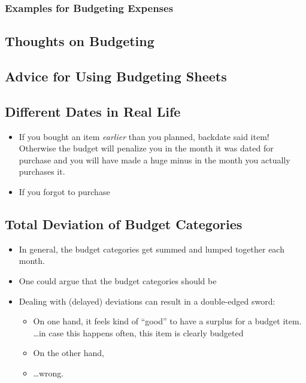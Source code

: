 \subsubsection{Examples for Budgeting Expenses}
\label{subsubsec:examples-budgeting-expenses}

\subsection{Thoughts on Budgeting}
\label{subsubsec:thoughts-on-budgeting}

\subsection{Advice for Using Budgeting Sheets}
\label{subsec:advice-budgeting-sheets}

\subsection{Different Dates in Real Life}
\label{subsec:Different-Dates}

\begin{itemize}
	\item If you bought an item \emph{earlier} than you planned, backdate said item! Otherwise the budget will penalize you in the month it was dated for purchase and you will have made a huge minus in the month you actually purchases it.
	\item If you forgot to purchase 
\end{itemize}

\subsection{Total Deviation of Budget Categories}
\label{subsec:Total-Deviation}

\begin{itemize}
	\item In general, the budget categories get summed and lumped together each month.
	\item One could argue that the budget categories should be 
	\item Dealing with (delayed) deviations can result in a double-edged sword:
	\begin{itemize}
		\item On one hand, it feels kind of ``good'' to have a surplus for a budget item.\\
		\ldots in case this happens often, this item is clearly budgeted
		\item On the other hand, 
		\item \ldots  wrong.
	\end{itemize}
\end{itemize}


